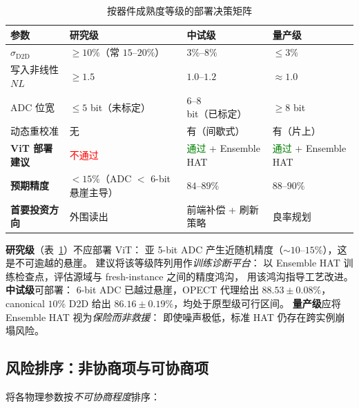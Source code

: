 \begin{table}[t]
\centering
\caption{按器件成熟度等级的部署决策矩阵}
\label{tab:maturity-matrix}
\small
\begin{tabularx}{\textwidth}{@{}>{\raggedright\arraybackslash}p{}>{\raggedright\arraybackslash}X>{\raggedright\arraybackslash}X>{\raggedright\arraybackslash}X@{}}
\toprule
\textbf{参数} & \textbf{研究级} & \textbf{中试级} & \textbf{量产级} \\
\midrule
$\sigma_{\mathrm{D2D}}$ & $\ge 10\%$（常 $15$--$20\%$） & $3\%$--$8\%$ & $\le 3\%$ \\
写入非线性 $NL$ & $\ge 1.5$ & $1.0$--$1.2$ & $\approx 1.0$ \\
ADC 位宽 & $\le 5$ bit（未标定） & $6$--$8$ bit（已标定） & $\ge 8$ bit \\
动态重校准 & 无 & 有（间歇式） & 有（片上） \\
\midrule
\textbf{ViT 部署建议} & \textcolor{red}{不通过} & \textcolor{green}{通过} + Ensemble HAT & \textcolor{green}{通过} + Ensemble HAT \\
\textbf{预期精度} & $<15\%$（ADC $<$ 6-bit 悬崖主导） & $84$--$89\%$ & $88$--$90\%$ \\
\textbf{首要投资方向} & 外围读出 & 前端补偿 + 刷新策略 & 良率规划 \\
\bottomrule
\end{tabularx}
\end{table}

\textbf{研究级}（表~\ref{tab:maturity-matrix}）不应部署 ViT：
亚 5-bit ADC 产生近随机精度（$\sim$$10$--$15\%$），这是不可逾越的悬崖。
建议将该等级阵列用作\emph{训练诊断平台}：
以 Ensemble HAT 训练检查点，评估源域与 fresh-instance 之间的精度鸿沟，
用该鸿沟指导工艺改进。
\textbf{中试级}可部署：
6-bit ADC 已越过悬崖，OPECT 代理给出 $88.53\pm0.08\%$，
canonical $10\%$ D2D 给出 $86.16\pm0.19\%$，均处于原型级可行区间。
\textbf{量产级}应将 Ensemble HAT 视为\emph{保险而非救援}：
即使噪声极低，标准 HAT 仍存在跨实例崩塌风险。

\subsection{风险排序：非协商项与可协商项}

将各物理参数按\emph{不可协商程度}排序：

